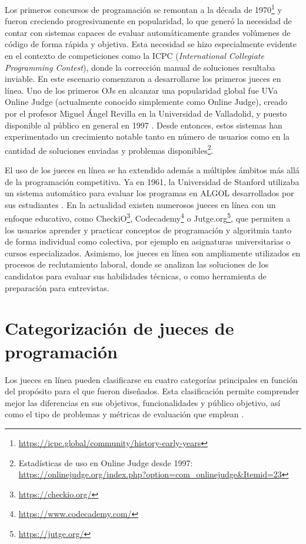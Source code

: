 Los primeros concursos de programación se remontan a la década de 1970\footnote{\url{https://icpc.global/community/history-early-years}} y fueron creciendo progresivamente en popularidad, lo que generó la necesidad de contar con sistemas capaces de evaluar automáticamente grandes volúmenes de código de forma rápida y objetiva. Esta necesidad se hizo especialmente evidente en el contexto de competiciones como la ICPC (\textit{International Collegiate Programming Contest}), donde la corrección manual de soluciones resultaba inviable. En este escenario comenzaron a desarrollarse los primeros jueces en línea. Uno de los primeros OJs en alcanzar una popularidad global fue UVa Online Judge (actualmente conocido simplemente como Online Judge), creado por el profesor Miguel Ángel Revilla en la Universidad de Valladolid, y puesto disponible al público en general en 1997 \citep{Revilla_Manzoor_Liu_2008}. Desde entonces, estos sistemas han experimentado un crecimiento notable tanto en número de usuarios como en la cantidad de soluciones enviadas y problemas disponibles\footnote{Estadísticas de uso en Online Judge desde 1997: \url{https://onlinejudge.org/index.php?option=com_onlinejudge&Itemid=23}}.

El uso de los jueces en línea se ha extendido además a múltiples ámbitos más allá de la programación competitiva. Ya en 1961, la Universidad de Stanford utilizaba un sistema automático para evaluar los programas en ALGOL desarrollados por sus estudiantes \citep{Forsythe_Wirth_1965}. En la actualidad existen numerosos jueces en línea con un enfoque educativo, como CheckiO\footnote{\url{https://checkio.org/}}, Codecademy\footnote{\url{https://www.codecademy.com/}} o Jutge.org\footnote{\url{https://jutge.org/}}, que permiten a los usuarios aprender y practicar conceptos de programación y algoritmia tanto de forma individual como colectiva, por ejemplo en asignaturas universitarias o cursos especializados. Asimismo, los jueces en línea son ampliamente utilizados en procesos de reclutamiento laboral, donde se analizan las soluciones de los candidatos para evaluar sus habilidades técnicas, o como herramienta de preparación para entrevistas.

\section{Categorización de jueces de programación}

Los jueces en línea pueden clasificarse en cuatro categorías principales en función del propósito para el que fueron diseñados. Esta clasificación permite comprender mejor las diferencias en sus objetivos, funcionalidades y público objetivo, así como el tipo de problemas y métricas de evaluación que emplean \citep{Wasik_Antczak_Badura_Laskowski_Sternal_2019}.

